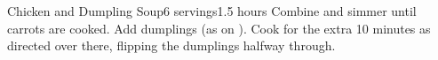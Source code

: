 \documentclass[../Cookbook.tex]{subfiles}
\begin{document}
\begin{recipe}[ChickenAndDumplingSoup]{Chicken and Dumpling Soup}{6 servings}{1.5 hours}
    Combine and simmer until carrots are cooked.
    Add dumplings (as on ).
    Cook for the extra 10 minutes as directed over there, flipping the dumplings halfway through.
\end{recipe}
\end{document}
